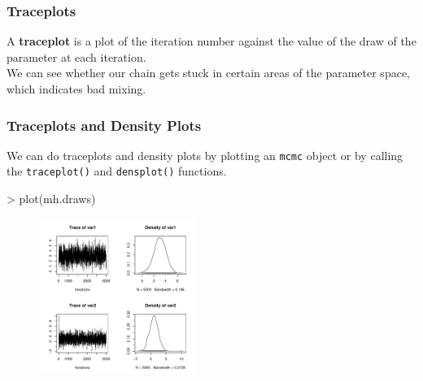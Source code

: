 \documentclass{beamer}
\begin{document}
\begin{frame}
\frametitle{Traceplots}
\pause
A \textbf{traceplot} is a plot of the iteration number against the
value of the draw of the parameter at each iteration.\\
\pause
\bigskip
We can see whether our chain gets stuck in certain areas of the
parameter space, which indicates bad mixing.

\pause

\begin{figure}[!htp]
\begin{center}
\end{center}
\end{figure}
\end{frame}

\begin{frame}[fragile]
\frametitle{Traceplots and Density Plots}
\pause
We can do traceplots and density plots by plotting an {\tt mcmc}
object or by calling the {\tt traceplot()} and {\tt densplot()} functions.
\pause
\medskip
\tiny
\begin{Schunk}
\begin{Sinput}
> plot(mh.draws)
\end{Sinput}
\end{Schunk}
\begin{figure}[!htp]
\begin{center}
\includegraphics[width=2in, height=2in]{convergence-trace.pdf}
\end{center}
\end{figure}
\normalsize
\end{frame}
\end{document}
